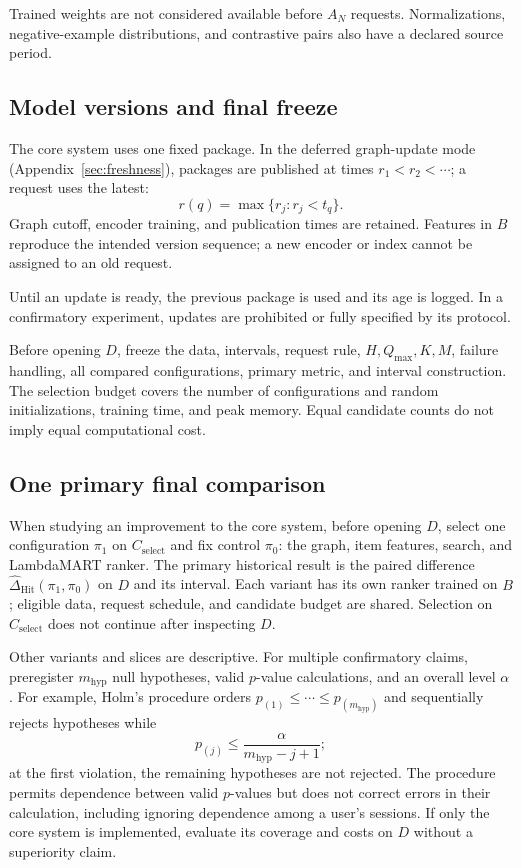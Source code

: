 \documentclass[12pt,a4paper]{article}
\theoremstyle{plainru}
\begin{document}
Trained weights are not considered available before $A_N$ requests.
Normalizations, negative-example distributions, and contrastive pairs
also have a declared source period.

\subsection{Model versions and final freeze}
\label{sec:eval-snapshots}

The core system uses one fixed package. In the deferred
graph-update mode (Appendix~\ref{sec:freshness}), packages
are published at times $r_1<r_2<\cdots$; a request uses the latest:
\begin{equation}\label{eq:eval-snapshot}
r(q)=\max\{r_j:r_j<t_q\}.
\end{equation}
Graph cutoff, encoder training, and publication times are retained.
Features in $B$ reproduce the intended version sequence;
a new encoder or index cannot be assigned to an old request.

Until an update is ready, the previous package is used and its age
is logged. In a confirmatory experiment, updates are prohibited
or fully specified by its protocol.

Before opening $D$, freeze the data, intervals, request rule,
$H,Q_{\max},K,M$, failure handling, all compared configurations,
primary metric, and interval construction. The selection budget covers
the number of configurations and random initializations, training time,
and peak memory. Equal candidate counts do not imply
equal computational cost.

\subsection{One primary final comparison}
\label{sec:eval-primary-comparison}

When studying an improvement to the core system, before opening $D$,
select one configuration $\pi_1$ on $C_{\mathrm{select}}$ and fix
control $\pi_0$: the graph, item features, search, and LambdaMART ranker.
The primary historical result is the paired difference
$\widehat\Delta_{\mathrm{Hit}}(\pi_1,\pi_0)$ on $D$ and its interval.
Each variant has its own ranker trained on $B$;
eligible data, request schedule, and candidate budget are shared.
Selection on $C_{\mathrm{select}}$ does not continue after inspecting $D$.

Other variants and slices are descriptive. For multiple confirmatory
claims, preregister $m_{\mathrm{hyp}}$ null hypotheses,
valid $p$-value calculations, and an overall level $\alpha$.
For example, Holm's procedure \cite{holm1979} orders
$p_{(1)}\le\cdots\le p_{(m_{\mathrm{hyp}})}$ and sequentially rejects
hypotheses while
\begin{equation}\label{eq:eval-holm}
 p_{(j)}\le\frac{\alpha}{m_{\mathrm{hyp}}-j+1};
\end{equation}
at the first violation, the remaining hypotheses are not rejected.
The procedure permits dependence between valid $p$-values but does not correct
errors in their calculation, including ignoring dependence among a user's sessions.
If only the core system is implemented, evaluate its coverage
and costs on $D$ without a superiority claim.
\end{document}
